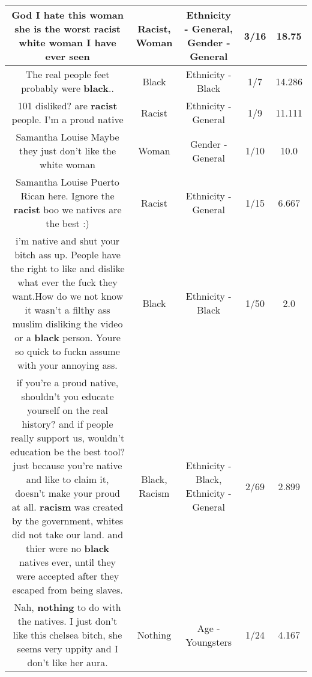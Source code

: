 \documentclass[11pt]{article}
\newlength\mylength
\begin{document}
\begin{center}
\begin{longtable}{|C{.65\mylength}|C{.30\mylength}|C{.12\mylength}|C{.12\mylength}|C{.12\mylength}|}
  \small God I hate this \textbf{woman} she is the worst \textbf{racist} white \textbf{woman} I have ever seen\normalsize   & Racist, Woman & Ethnicity - General, Gender - General & 3/16 & 18.75 \\  \hline
  \small The real people feet probably were \textbf{black}..\normalsize   & Black & Ethnicity - Black & 1/7 & 14.286 \\  \hline
  \small 101 disliked? are \textbf{racist} people. I'm a proud native\normalsize   & Racist & Ethnicity - General & 1/9 & 11.111 \\  \hline
  \small Samantha Louise Maybe they just don't like the white  woman\normalsize   & Woman & Gender - General & 1/10 & 10.0 \\  \hline
  \small Samantha Louise Puerto Rican here. Ignore the \textbf{racist} boo we natives are the best :)\normalsize   & Racist & Ethnicity - General & 1/15 & 6.667 \\  \hline
  \small i'm native and shut your bitch ass up. People have the right to like and dislike what ever the fuck they want.How do we not know it wasn't a filthy ass muslim disliking the video or a \textbf{black} person. Youre so quick to fuckn assume with your annoying ass.\normalsize   & Black & Ethnicity - Black & 1/50 & 2.0 \\  \hline
  \small if you're a proud native, shouldn't you educate yourself on the real history? and if people really support us, wouldn't education be the best tool? just because you're native and like to claim it, doesn't make your proud at all. \textbf{racism} was created by the government, whites did not take our land. and thier were no \textbf{black} natives ever, until they were accepted after they escaped from being slaves.\normalsize   & Black, Racism & Ethnicity - Black, Ethnicity - General & 2/69 & 2.899 \\  \hline
  \small Nah, \textbf{nothing} to do with the natives. I just don't like this chelsea bitch, she seems very uppity and I don't like her aura.\normalsize   & Nothing & Age - Youngsters & 1/24 & 4.167 \\  \hline

\end{longtable}
\end{center}
\end{document}
